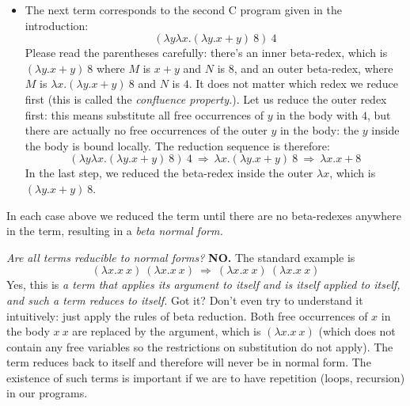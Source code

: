 \begin{itemize}
\item  The next term corresponds to the second C program given in the
  introduction:
  $$(\lambda y\lambda x.(\lambda y.x+y)~8)~4$$  Please
read the parentheses carefully: there's an inner beta-redex, which is
$(\lambda y.x+y)~8$ where $M$ is $x+y$ and $N$ is 8, and an outer beta-redex,
where $M$ is $\lambda x.(\lambda y.x+y)~8$ and $N$ is $4$.  It does not
matter which redex we reduce first (this is called the {\em confluence property.\/}). Let us reduce the outer redex first:
this means substitute all free occurrences of $y$ in the body with $4$, but
there are actually no free occurrences of the outer $y$ in the body: the
$y$ inside the body is bound locally.  The reduction sequence is therefore:
$$(\lambda y\lambda x.(\lambda y.x+y)~8)~4 ~\Rightarrow~
\lambda x.(\lambda y.x+y)~8 ~\Rightarrow~  \lambda x.x+8
$$
In the last step, we reduced the beta-redex inside the outer $\lambda x$, which
is $(\lambda y.x+y)~8$.
\end{itemize}
In each case above we reduced the term until there are no beta-redexes anywhere
in the term, resulting in a {\em beta normal form.\/}

{\em Are all terms reducible to normal forms?\/} {\bf NO.} The standard example
is
$$
(\lambda x.x~x) ~(\lambda x.x~x) ~\Rightarrow~
(\lambda x.x~x) ~(\lambda x.x~x)
$$
Yes, this is {\em a term that applies its argument to itself and is itself applied to itself, and
such a term reduces to itself.\/} Got it?  Don't even try to understand it
intuitively: just apply the rules of beta reduction.
Both free occurrences of $x$ in the body $x~x$ are replaced by the argument,
which is $(\lambda x.x~x)$ (which does not contain any free variables so the
restrictions on substitution do not apply).
The term reduces back to itself and therefore will never be in normal form.
The existence of such terms is important if we are to have repetition
(loops, recursion) in our programs.



